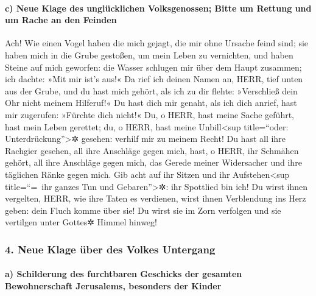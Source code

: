 \hypertarget{c-neue-klage-des-ungluxfccklichen-volksgenossen-bitte-um-rettung-und-um-rache-an-den-feinden}{%
\paragraph{c) Neue Klage des unglücklichen Volksgenossen; Bitte um
Rettung und um Rache an den
Feinden}\label{c-neue-klage-des-ungluxfccklichen-volksgenossen-bitte-um-rettung-und-um-rache-an-den-feinden}}

Ach! Wie einen Vogel haben die mich gejagt, die mir ohne
Ursache feind sind; sie haben mich in die Grube gestoßen,
um mein Leben zu vernichten, und haben Steine auf mich geworfen:
die Wasser schlugen mir über dem Haupt zusammen; ich
dachte: »Mit mir ist's aus!« Da rief ich deinen Namen an,
HERR, tief unten aus der Grube, und du hast mich gehört,
als ich zu dir flehte: »Verschließ dein Ohr nicht meinem Hilferuf!«
Du hast dich mir genaht, als ich dich anrief, hast mir
zugerufen: »Fürchte dich nicht!« Du, o HERR, hast meine
Sache geführt, hast mein Leben gerettet; du, o HERR, hast
meine Unbill\textless sup title=``oder: Unterdrückung''\textgreater✲
gesehen: verhilf mir zu meinem Recht! Du hast all ihre
Rachgier gesehen, all ihre Anschläge gegen mich, hast, o
HERR, ihr Schmähen gehört, all ihre Anschläge gegen mich,
das Gerede meiner Widersacher und ihre täglichen Ränke
gegen mich. Gib acht auf ihr Sitzen und ihr
Aufstehen\textless sup title=``=~ihr ganzes Tun und
Gebaren''\textgreater✲: ihr Spottlied bin ich! Du wirst
ihnen vergelten, HERR, wie ihre Taten es verdienen, wirst
ihnen Verblendung ins Herz geben: dein Fluch komme über sie!
Du wirst sie im Zorn verfolgen und sie vertilgen unter
Gottes✲ Himmel hinweg!

\hypertarget{neue-klage-uxfcber-des-volkes-untergang}{%
\subsubsection{4. Neue Klage über des Volkes
Untergang}\label{neue-klage-uxfcber-des-volkes-untergang}}

\hypertarget{a-schilderung-des-furchtbaren-geschicks-der-gesamten-bewohnerschaft-jerusalems-besonders-der-kinder}{%
\paragraph{a) Schilderung des furchtbaren Geschicks der gesamten
Bewohnerschaft Jerusalems, besonders der
Kinder}\label{a-schilderung-des-furchtbaren-geschicks-der-gesamten-bewohnerschaft-jerusalems-besonders-der-kinder}}

